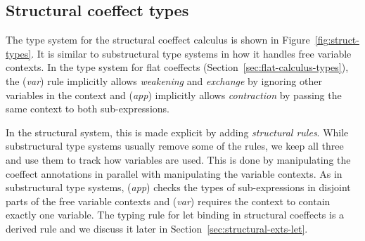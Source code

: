 
\subsection{Structural coeffect types}
\label{sec:struct-calculus-types}

The type system for the structural coeffect calculus is shown in Figure~\ref{fig:struct-types}.
It is similar to substructural type systems
\cite{substruct-attpl-intro} in how it handles free variable contexts. In the type system for
flat coeffects (Section~\ref{sec:flat-calculus-types}), the (\emph{var}) rule implicitly allows
\emph{weakening} and \emph{exchange} by ignoring other variables in the context and
(\emph{app}) implicitly allows \emph{contraction} by passing the same context to both sub-expressions.

In the structural system, this is made explicit by adding \emph{structural rules}.
While substructural type systems usually remove some of the rules, we keep all three and
use them to track how variables are used. This is done by manipulating the coeffect annotations
in parallel with manipulating the variable contexts. As in substructural type systems, (\emph{app})
checks the types of sub-expressions in disjoint parts of the free variable contexts and
(\emph{var}) requires the context to contain exactly one variable. The typing rule for let binding in
structural coeffects is a derived rule and we discuss it later in Section~\ref{sec:structural-exts-let}.

~


